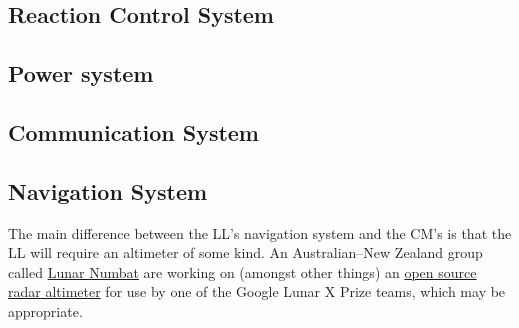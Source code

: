 \documentclass{report}
\begin{document}
\subsection{Reaction Control System}
\subsection{Power system}
\subsection{Communication System}
\subsection{Navigation System}

The main difference between the LL's navigation system and the CM's is that the LL will require an altimeter of some kind.  An Australian--New Zealand group called \href{http://www.lunarnumbat.org}{Lunar Numbat} are working on (amongst other things) an \href{http://www.lunarnumbat.org/cgi-bin/twiki/view/LunarNumbat/LNTaskRadarAltimeter}{open source radar altimeter} for use by one of the Google Lunar X Prize teams, which may be appropriate.
\end{document}
